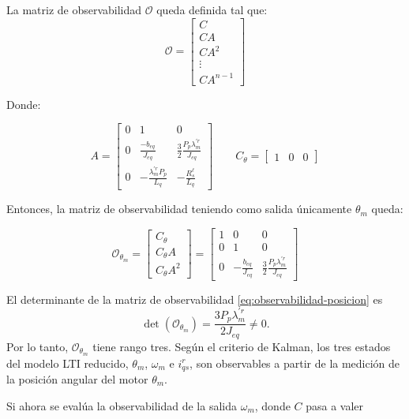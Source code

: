 \documentclass[blue,fullpaper]{ludusofficial}  %
\begin{document}
La matriz de observabilidad $\mathcal{O}$ queda definida tal que:
\begin{equation}
\label{eq:observabilidad-kalman}
\mathcal{O} = \begin{bmatrix}
C \\
CA \\
CA^2 \\
\vdots \\
CA^{n-1}
\end{bmatrix}
\end{equation}

Donde: 

\[
A = \begin{bmatrix}
0 & 1 & 0 \\
0 & \frac{-b_{eq}}{J_{eq}} & \frac{3}{2}\frac{P_p\lambda_{m}^{'r}}{J_{eq}} \\
0 & -\frac{\lambda^{'r}_{m}P_p}{L_q} & -\frac{R^\ell_s}{L_q}
\end{bmatrix}
\qquad
C_\theta=\begin{bmatrix}
    1& 0& 0
\end{bmatrix}
\]

Entonces, la matriz de observabilidad teniendo como salida únicamente $\theta_m$ queda:

\begin{equation}
\label{eq:observabilidad-posicion}
    \mathcal{O}_{\theta_m} = \begin{bmatrix}
C_\theta \\
C_\theta A \\
C_\theta A^2
\end{bmatrix}=\begin{bmatrix}
1 & 0 & 0 \\
0 & 1 & 0 \\
0 & -\frac{b_{eq}}{J_{eq}} & \frac{3}{2}\frac{P_p\lambda_{m}^{'r}}{J_{eq}}
\end{bmatrix}
\end{equation}

El determinante de la matriz de observabilidad
\eqref{eq:observabilidad-posicion} es
\[
    \det(\mathcal{O}_{\theta_m})
    = \frac{3P_p\lambda_m^{'r}}{2J_{eq}}
    \neq 0.
\]
Por lo tanto, $\mathcal{O}_{\theta_m}$ tiene rango tres.
Según el criterio de Kalman, los tres estados del modelo LTI
reducido, $\theta_m$, $\omega_m$ e $i_{qs}^{r}$, son observables
a partir de la medición de la posición angular del motor
$\theta_m$.

Si ahora se evalúa la observabilidad de la salida $\omega_m$, donde $C$ pasa a valer 
\end{document}
